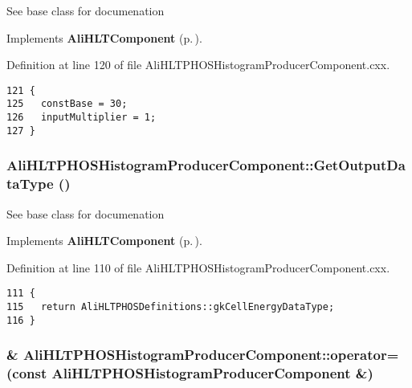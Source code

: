 See base class for documenation 

Implements {\bf Ali\-HLTComponent} {\rm (p.\,\pageref{classAliHLTComponent_a12})}.

Definition at line 120 of file Ali\-HLTPHOSHistogram\-Producer\-Component.cxx.

\footnotesize\begin{verbatim}121 {
125   constBase = 30;
126   inputMultiplier = 1;
127 }
\end{verbatim}\normalsize 


\subsubsection{ Ali\-HLTPHOSHistogram\-Producer\-Component::Get\-Output\-Data\-Type ()\hspace{0.3cm}{\tt  [virtual]}}\label{classAliHLTPHOSHistogramProducerComponent_a12}


See base class for documenation 

Implements {\bf Ali\-HLTComponent} {\rm (p.\,\pageref{classAliHLTComponent_a11})}.

Definition at line 110 of file Ali\-HLTPHOSHistogram\-Producer\-Component.cxx.

\footnotesize\begin{verbatim}111 {
115   return AliHLTPHOSDefinitions::gkCellEnergyDataType;
116 }
\end{verbatim}\normalsize 


\subsubsection{\& Ali\-HLTPHOSHistogram\-Producer\-Component::operator= (const {\bf Ali\-HLTPHOSHistogram\-Producer\-Component} \&)\hspace{0.3cm}{\tt  [inline]}}\label{classAliHLTPHOSHistogramProducerComponent_a3}




